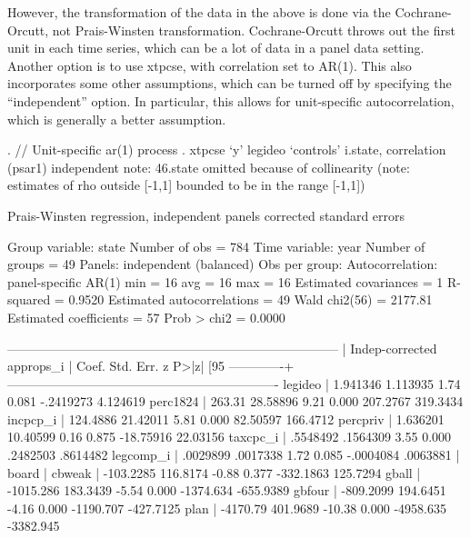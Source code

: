\documentclass[12pt]{article}
\begin{document}
However, the transformation of the data in the above is done via the
Cochrane-Orcutt, not Prais-Winsten transformation. Cochrane-Orcutt
throws out the first unit in each time series, which can be a lot of
data in a panel data setting. Another option is to use xtpcse, with
correlation set to AR(1). This also incorporates some other
assumptions, which can be turned off by specifying the ``independent''
option. In particular, this allows for unit-specific autocorrelation,
which is generally a better assumption.  


   \begin{stlog}

. // Unit-specific ar(1) process
.  xtpcse `y' legideo `controls' i.state, correlation (psar1) independent
note: 46.state omitted because of collinearity
(note: estimates of rho outside [-1,1] bounded to be in the range [-1,1])

Prais-Winsten regression, independent panels corrected standard errors

Group variable:   state                         Number of obs     =        784
Time variable:    year                          Number of groups  =         49
Panels:           independent (balanced)        Obs per group:
Autocorrelation:  panel-specific AR(1)                        min =         16
                                                              avg =         16
                                                              max =         16
Estimated covariances      =         1          R-squared         =     0.9520
Estimated autocorrelations =        49          Wald chi2(56)     =    2177.81
Estimated coefficients     =        57          Prob > chi2       =     0.0000

------------------------------------------------------------------------------
             |           Indep-corrected
   approps_i |      Coef.   Std. Err.      z    P>|z|     [95%
-------------+----------------------------------------------------------------
     legideo |   1.941346   1.113935     1.74   0.081    -.2419273    4.124619
    perc1824 |     263.31   28.58896     9.21   0.000     207.2767    319.3434
    incpcp_i |   124.4886   21.42011     5.81   0.000     82.50597    166.4712
    percpriv |   1.636201   10.40599     0.16   0.875    -18.75916    22.03156
    taxcpc_i |   .5548492   .1564309     3.55   0.000     .2482503    .8614482
   legcomp_i |   .0029899   .0017338     1.72   0.085    -.0004084    .0063881
             |
       board |
     cbweak  |  -103.2285   116.8174    -0.88   0.377    -332.1863    125.7294
      gball  |  -1015.286   183.3439    -5.54   0.000    -1374.634   -655.9389
     gbfour  |  -809.2099   194.6451    -4.16   0.000    -1190.707   -427.7125
       plan  |   -4170.79   401.9689   -10.38   0.000    -4958.635   -3382.945
  
   \end{stlog}
\end{document}
